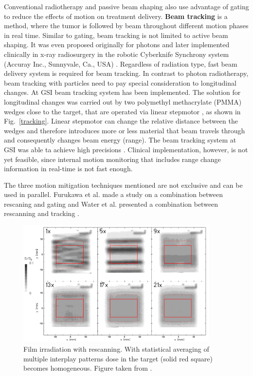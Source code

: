 \documentclass[type=dr, dr=rernat, accentcolor=tud7b,colorbacktitle, bigchapter, openright, twoside, 12pt ]{tudthesis}
\begin{document}
Conventional radiotherapy and passive beam shaping also use advantage of gating to reduce the effects of motion on treatment delivery.
\newline
\textbf{Beam tracking} is a method, where the tumor is followed by beam throughout different motion phases in real time. Similar to gating, beam tracking is not limited to active beam shaping. It was even proposed originally 
for photons \cite{Keall2001} and later implemented clinically in x-ray radiosurgery in the robotic Cyberknife Synchrony system (Accuray Inc., Sunnyvale, Ca., USA) \cite{Brown2007a,Kilby2010}. Regardless of radiation type, 
fast beam delivery system is required for beam tracking. In contrast to photon radiotherapy, beam tracking with particles need to pay special consideration to longitudinal changes. At GSI beam tracking system has been implemented.
The solution for longitudinal changes was carried out by two polymethyl methacrylate (PMMA) wedges close to the target, that are operated via linear stepmotor \cite{Saito2009}, as shown in Fig.~\ref{tracking}. Linear stepmotor can
change the relative distance between the wedges and therefore introduces more or less material that beam travels through and consequently changes beam energy (range). The beam tracking system at GSI was able ta achieve high precisions \cite{Bert2007, Bert2009, Saito2009}. Clinical implementation, however, is not yet feasible, since internal motion monitoring that includes range change information in real-time is not fast enough.


The three motion mitigation techniques mentioned are not exclusive and can be used in parallel. Furukawa et al. made a study on a combination between rescaning and gating \cite{Furukawa2007} and Water et al. presented a combination
between rescanning and tracking \cite{Water2009}.
\begin{figure}[H]
\begin{center}
\includegraphics[width=0.9\textwidth]{./Images/rescanning.png}
\caption{Film irradiation with rescanning. With statistical averaging of multiple interplay patterns dose in the target (solid red square) becomes homogeneous. Figure taken from \cite{Bert09}.}
\label{rescanning}
\end{center}
\end{figure}
\end{document}
